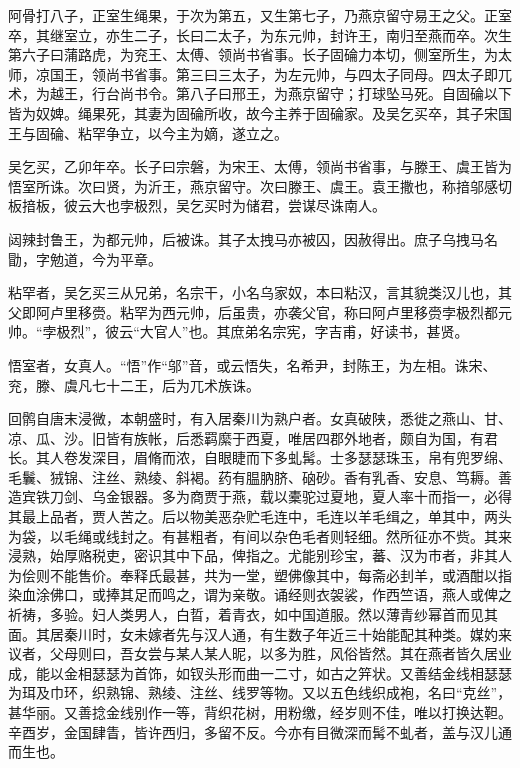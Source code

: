\documentclass[]{article}
\begin{document}
阿骨打八子，正室生绳果，于次为第五，又生第七子，乃燕京留守易王之父。正室卒，其继室立，亦生二子，长曰二太子，为东元帅，封许王，南归至燕而卒。次生第六子曰蒲路虎，为兖王、太傅、领尚书省事。长子固碖力本切，侧室所生，为太师，凉国王，领尚书省事。第三曰三太子，为左元帅，与四太子同母。四太子即兀术，为越王，行台尚书令。第八子曰邢王，为燕京留守；打球坠马死。自固碖以下皆为奴婢。绳果死，其妻为固碖所收，故今主养于固碖家。及吴乞买卒，其子宋国王与固碖、粘罕争立，以今主为嫡，遂立之。

吴乞买，乙卯年卒。长子曰宗磐，为宋王、太傅，领尚书省事，与滕王、虞王皆为悟室所诛。次曰贤，为沂王，燕京留守。次曰滕王、虞王。袁王撒也，称揞邬感切板揞板，彼云大也孛极烈，吴乞买时为储君，尝谋尽诛南人。

闼辣封鲁王，为都元帅，后被诛。其子太拽马亦被囚，因赦得出。庶子乌拽马名勖，字勉道，今为平章。

粘罕者，吴乞买三从兄弟，名宗干，小名乌家奴，本曰粘汉，言其貌类汉儿也，其父即阿卢里移赍。粘罕为西元帅，后虽贵，亦袭父官，称曰阿卢里移赍孛极烈都元帅。``孛极烈''，彼云``大官人''也。其庶弟名宗宪，字吉甫，好读书，甚贤。

悟室者，女真人。``悟''作``邬''音，或云悟失，名希尹，封陈王，为左相。诛宋、兖，滕、虞凡七十二王，后为兀术族诛。

回鹘自唐末浸微，本朝盛时，有入居秦川为熟户者。女真破陕，悉徙之燕山、甘、凉、瓜、沙。旧皆有族帐，后悉羁縻于西夏，唯居四郡外地者，颇自为国，有君长。其人卷发深目，眉脩而浓，自眼睫而下多虬髯。士多瑟瑟珠玉，帛有兜罗绵、毛鬤、狨锦、注丝、熟绫、斜褐。药有腽肭脐、硇砂。香有乳香、安息、笃耨。善造宾铁刀剑、乌金银器。多为商贾于燕，载以橐驼过夏地，夏人率十而指一，必得其最上品者，贾人苦之。后以物美恶杂贮毛连中，毛连以羊毛缉之，单其中，两头为袋，以毛绳或线封之。有甚粗者，有间以杂色毛者则轻细。然所征亦不赀。其来浸熟，始厚赂税吏，密识其中下品，俾指之。尤能别珍宝，蕃、汉为市者，非其人为侩则不能售价。奉释氏最甚，共为一堂，塑佛像其中，每斋必刲羊，或酒酣以指染血涂佛口，或捧其足而鸣之，谓为亲敬。诵经则衣袈裟，作西竺语，燕人或俾之祈祷，多验。妇人类男人，白晢，着青衣，如中国道服。然以薄青纱幂首而见其面。其居秦川时，女未嫁者先与汉人通，有生数子年近三十始能配其种类。媒妁来议者，父母则曰，吾女尝与某人某人昵，以多为胜，风俗皆然。其在燕者皆久居业成，能以金相瑟瑟为首饰，如钗头形而曲一二寸，如古之笄状。又善结金线相瑟瑟为珥及巾环，织熟锦、熟绫、注丝、线罗等物。又以五色线织成袍，名曰``克丝''，甚华丽。又善捻金线别作一等，背织花树，用粉缴，经岁则不佳，唯以打换达靼。辛酉岁，金国肆眚，皆许西归，多留不反。今亦有目微深而髯不虬者，盖与汉儿通而生也。
\end{document}
